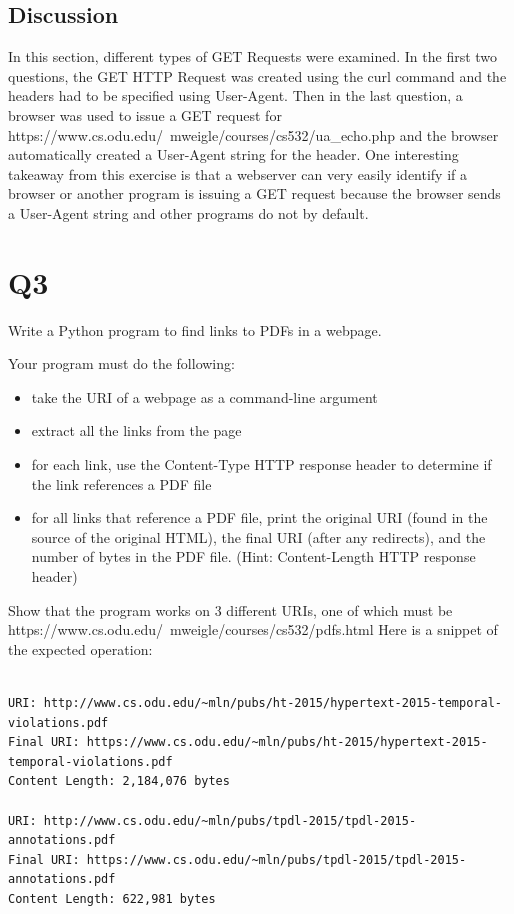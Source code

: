 \documentclass[12pt]{article}
\begin{document}
\subsection*{Discussion}
In this section, different types of GET Requests were examined. In the first two questions, the GET HTTP Request was created using the curl command and the headers had to be specified using User-Agent. Then
in the last question, a browser was used to issue a GET request for https://www.cs.odu.edu/~mweigle/courses/cs532/ua\_echo.php and the browser automatically created a User-Agent string for the header. One interesting
takeaway from this exercise is that a webserver can very easily identify if a browser or another program is issuing a GET request because the browser sends a User-Agent string and other programs do not by default. 


\section*{Q3}
Write a Python program to find links to PDFs in a webpage.

Your program must do the following:
\begin{itemize}
    \item take the URI of a webpage as a command-line argument
    \item extract all the links from the page
    \item for each link, use the Content-Type HTTP response header to determine if the link references a PDF file
    \item for all links that reference a PDF file, print the original URI (found in the source of the original HTML), the final URI (after any redirects), and the number of bytes in the PDF file. (Hint: Content-Length HTTP response header)
\end{itemize}
Show that the program works on 3 different URIs, one of which must be https://www.cs.odu.edu/~mweigle/courses/cs532/pdfs.html
Here is a snippet of the expected operation:

\begin{lstlisting}[numbers=none, caption=Expected Output, label=lst:q3ExpectedOutput]
% python3 findPDFs.py https://www.cs.odu.edu/~mweigle/courses/cs532/pdfs.html

URI: http://www.cs.odu.edu/~mln/pubs/ht-2015/hypertext-2015-temporal-violations.pdf
Final URI: https://www.cs.odu.edu/~mln/pubs/ht-2015/hypertext-2015-temporal-violations.pdf
Content Length: 2,184,076 bytes

URI: http://www.cs.odu.edu/~mln/pubs/tpdl-2015/tpdl-2015-annotations.pdf
Final URI: https://www.cs.odu.edu/~mln/pubs/tpdl-2015/tpdl-2015-annotations.pdf
Content Length: 622,981 bytes
\end{lstlisting}
\end{document}
